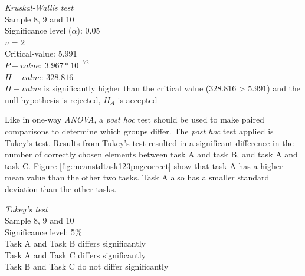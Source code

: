  \begin{center}
	\begin{tcolorbox}[width=0.8\textwidth]
		\centering
		\textit{Kruskal-Wallis test}\\
		Sample 8, 9 and 10\\[0.5cm]
		
		Significance level ($\alpha$): 0.05 \\
		$v$ = 2\\ %
		Critical-value:  5.991\\[0.2cm] %
		$P-value$: $3.967* 10^{-72}$ \\
		$H-value$: $328.816$ \\
		
		$H-value$ is significantly higher than the critical value ($328.816$ > $5.991$) and the null hypothesis is \underline{rejected}, $H_A$ is accepted\\[0.5cm]
	\end{tcolorbox} 
\end{center}
\vspace{0.3cm}

Like in one-way \textit{ANOVA}, a \textit{post hoc} test should be used to make paired comparisons to determine which groups differ. The \textit{post hoc} test applied is Tukey's test. Results from Tukey's test resulted in a significant difference in the number of correctly chosen elements between task A and task B, and task A and task C. Figure \ref{fig:meanstdtask123pngcorrect} show that task A has a higher mean value than the other two tasks. Task A also has a smaller standard deviation than the other tasks. \\[0.2cm]

 \begin{center}
	\begin{tcolorbox}[width=0.8\textwidth]
		\centering
		\textit{Tukey's test}\\
		Sample 8, 9 and 10 \\
		Significance level: 5\%  \\[0.5cm]
		
		Task A and Task B differs significantly \\
		Task A and Task C differs significantly \\
		Task B and Task C do not differ significantly \\[0.2cm]
	\end{tcolorbox} 
\end{center}

